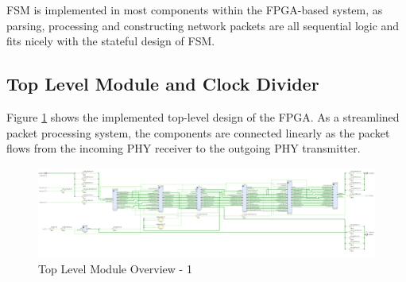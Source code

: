 \documentclass[a4paper]{report}
\begin{document}
FSM is implemented in most components within the FPGA-based system, as parsing, processing and constructing network packets are all sequential logic and fits nicely with the stateful design of FSM.

\subsection{Top Level Module and Clock Divider}
\label{section:implementation-hardware-implementation-top-level-clock-divdier}

Figure \ref{fig:top-level-design} shows the implemented top-level design of the FPGA. As a streamlined packet processing system, the components are connected linearly as the packet flows from the incoming PHY receiver to the outgoing PHY transmitter.

\begin{landscape}
\begin{figure}[h!]
  \centering
  \includegraphics*[viewport={0 0 950 600}, height=\textwidth, width=2\textheight, keepaspectratio]{imgs/top-level-module.png}
  \caption{Top Level Module Overview - 1}
  \label{fig:top-level-design}
\end{figure}
\begin{figure}[h!]
  \ContinuedFloat
  \centering

\end{figure}
\end{landscape}
\end{document}
